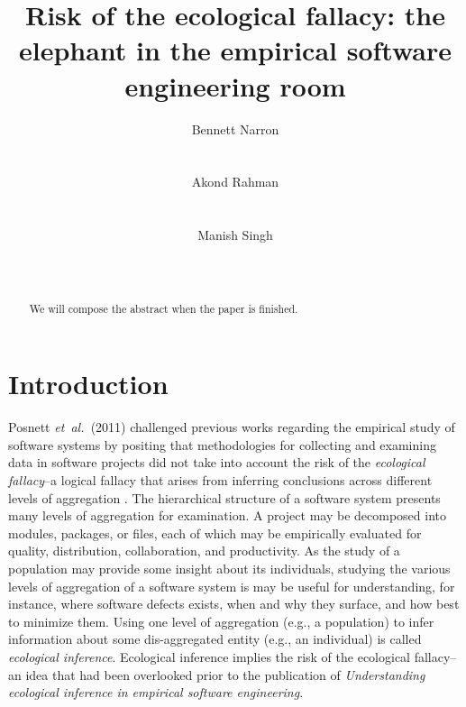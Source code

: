 \documentclass{sig-alternate-05-2015}
\newcommand{\etal}{\mbox{\emph{et al.\ }}}
\begin{document}
    
\title{Risk of the ecological fallacy: the elephant in the empirical software engineering room}


\author{
\alignauthor
Bennett Narron\\
       \\
       \\
\alignauthor
Akond Rahman\\
       \\
       \\
\alignauthor
Manish Singh\\
       \\
       \\
}

\maketitle

\begin{abstract}
We will compose the abstract when the paper is finished.
\end{abstract}


\section{Introduction}

Posnett \etal (2011) challenged previous works regarding the empirical study of software systems by positing that methodologies for collecting and examining data in software projects did not take into account the risk of the \emph{ecological fallacy}--a logical fallacy that arises from inferring conclusions across different levels of aggregation \cite{Posnett:2011}. The hierarchical structure of a software system presents many levels of aggregation for examination.  A project may be decomposed into modules, packages, or files, each of which may be empirically evaluated for quality, distribution, collaboration, and productivity.  As the study of a population may provide some insight about its individuals, studying the various levels of aggregation of a software system is may be useful for understanding, for instance, where software defects exists, when and why they surface, and how best to minimize them.  Using one level of aggregation (e.g., a population) to infer information about some dis-aggregated entity (e.g., an individual) is called \emph{ecological inference}.  Ecological inference implies the risk of the ecological fallacy--an idea that had been overlooked prior to the publication of \emph{Understanding ecological inference in empirical software engineering}.
\end{document}
